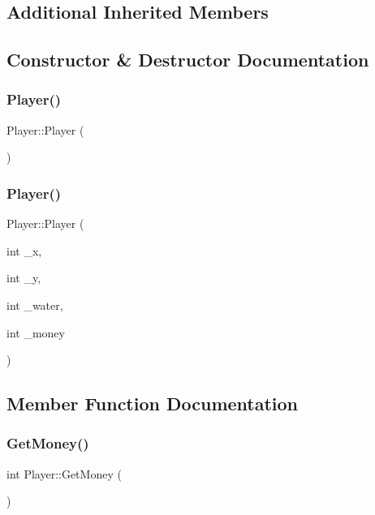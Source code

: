 \subsection*{Additional Inherited Members}


\subsection{Constructor \& Destructor Documentation}
\mbox{\label{classPlayer_affe0cc3cb714f6deb4e62f0c0d3f1fd8}} 
\subsubsection{\texorpdfstring{Player()}{Player()}\hspace{0.1cm}{\footnotesize\ttfamily [1/2]}}
{\footnotesize\ttfamily Player\+::\+Player (\begin{DoxyParamCaption}{ }\end{DoxyParamCaption})}

\mbox{\label{classPlayer_a137fd46dd7dafa0d2fd5945bd95e028a}} 
\subsubsection{\texorpdfstring{Player()}{Player()}\hspace{0.1cm}{\footnotesize\ttfamily [2/2]}}
{\footnotesize\ttfamily Player\+::\+Player (\begin{DoxyParamCaption}\item[{int}]{\+\_\+x,  }\item[{int}]{\+\_\+y,  }\item[{int}]{\+\_\+water,  }\item[{int}]{\+\_\+money }\end{DoxyParamCaption})}



\subsection{Member Function Documentation}
\mbox{\label{classPlayer_a28e2f3a0b4ed47cfe7950029ad33878f}} 
\subsubsection{\texorpdfstring{GetMoney()}{GetMoney()}}
{\footnotesize\ttfamily int Player\+::\+Get\+Money (\begin{DoxyParamCaption}{ }\end{DoxyParamCaption})}

